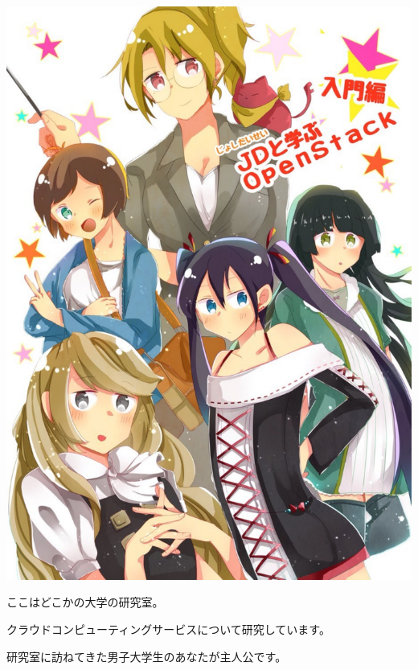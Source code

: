 \documentclass[9pt,b5paper,tombo,openany]{jsbook}
\begin{document}
\enlargethispage{\paperwidth}
\thispagestyle{empty}
\vspace*{-1truein}
\vspace*{-\topmargin}
\vspace*{-\headheight}
\vspace*{-1.05\headsep}
\vspace*{-\topskip}
\noindent\hspace*{-1in}\hspace*{-0.5\oddsidemargin}
\includegraphics[width=1.02\paperwidth]{./img/cover.pdf}

\newpage

\thispagestyle{empty}

ここはどこかの大学の研究室。

クラウドコンピューティングサービスについて研究しています。

研究室に訪ねてきた男子大学生のあなたが主人公です。
\end{document}
